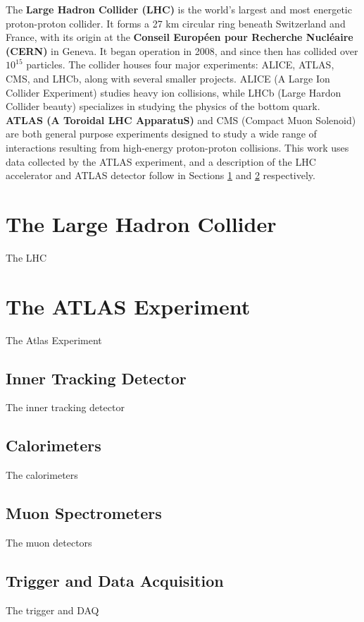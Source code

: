 \label{chapter:lhcatlas}

The \textbf{Large Hadron Collider (LHC)} is the world's largest and most energetic proton-proton collider. It forms a 27 km circular ring beneath Switzerland and France, with its origin at the \textbf{Conseil Européen pour Recherche Nucléaire (CERN)} in Geneva. It began operation in 2008, and since then has collided over $10^{15}$ particles. The collider houses four major experiments: ALICE, ATLAS, CMS, and LHCb, along with several smaller projects. ALICE (A Large Ion Collider Experiment) studies heavy ion collisions, while LHCb (Large Hardon Collider beauty) specializes in studying the physics of the bottom quark. \textbf{ATLAS (A Toroidal LHC ApparatuS)} and CMS (Compact Muon Solenoid) are both general purpose experiments designed to study a wide range of interactions resulting from high-energy proton-proton collisions. This work uses data collected by the ATLAS experiment, and a description of the LHC accelerator and ATLAS detector follow in Sections \ref{section:lhc} and \ref{section:atlas} respectively.

\section{The Large Hadron Collider}
\label{section:lhc}
The LHC

\section{The ATLAS Experiment}
\label{section:atlas}
The Atlas Experiment
\subsection{Inner Tracking Detector}
The inner tracking detector
\subsection{Calorimeters}
The calorimeters
\subsection{Muon Spectrometers}
The muon detectors
\subsection{Trigger and Data Acquisition}
The trigger and DAQ

% 
